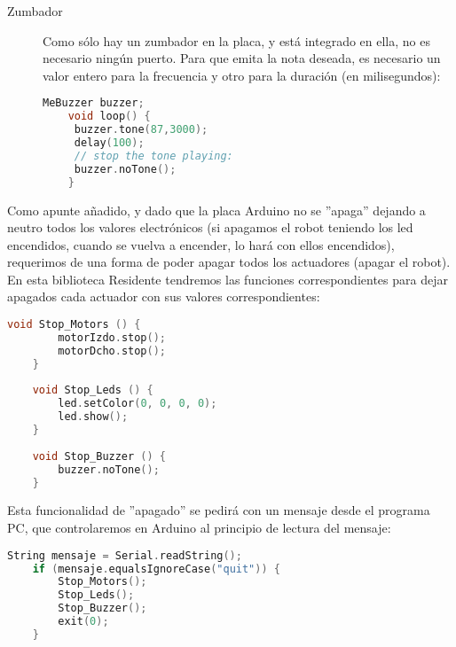 \begin{description}
	\item [Zumbador] Como sólo hay un zumbador en la placa, y está integrado en ella, no es necesario ningún puerto. Para que emita la nota deseada, es necesario un valor entero para la frecuencia y otro para la duración (en milisegundos):
	\begin{lstlisting}[language=C,caption={Uso del zumbador}]	
	MeBuzzer buzzer;
	void loop() {
	 buzzer.tone(87,3000);
	 delay(100);
	 // stop the tone playing:
	 buzzer.noTone();
	}
	\end{lstlisting}
\end{description}

\par Como apunte añadido, y dado que la placa Arduino no se ''apaga'' dejando a neutro todos los valores electrónicos (si apagamos el robot teniendo los led encendidos, cuando se vuelva a encender, lo hará con ellos encendidos), requerimos de una forma de poder apagar todos los actuadores (apagar el robot). En esta biblioteca Residente tendremos las funciones correspondientes para dejar apagados cada actuador con sus valores correspondientes:

\begin{lstlisting}[language=C,caption={Apagado de los actuadores}]
	void Stop_Motors () {
		motorIzdo.stop();
		motorDcho.stop();
	}
	
	void Stop_Leds () {
		led.setColor(0, 0, 0, 0);
		led.show();
	}
	
	void Stop_Buzzer () {
		buzzer.noTone();
	}	
\end{lstlisting}

Esta funcionalidad de ''apagado'' se pedirá con un mensaje desde el programa PC, que controlaremos en Arduino al principio de lectura del mensaje:

\begin{lstlisting}[language=C,caption={Apagado de los actuadores}]
	String mensaje = Serial.readString();
	if (mensaje.equalsIgnoreCase("quit")) {
		Stop_Motors();
		Stop_Leds();
		Stop_Buzzer();
		exit(0);
	}
\end{lstlisting}

